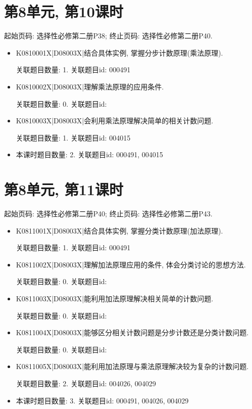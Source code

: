 \section*{第8单元, 第10课时}
起始页码: 选择性必修第二册P38; 终止页码: 选择性必修第二册P40.
\begin{itemize}
\item K0810001X|D08003X|结合具体实例, 掌握分步计数原理(乘法原理).

关联题目数量: 1. 关联题目id: 000491

\item K0810002X|D08003X|理解乘法原理的应用条件.

关联题目数量: 0. 关联题目id: 

\item K0810003X|D08003X|会利用乘法原理解决简单的相关计数问题.

关联题目数量: 1. 关联题目id: 004015

\item 本课时题目数量: 2. 关联题目id: 000491, 004015

\end{itemize}

\section*{第8单元, 第11课时}
起始页码: 选择性必修第二册P40; 终止页码: 选择性必修第二册P43.
\begin{itemize}
\item K0811001X|D08003X|结合具体实例, 掌握分类计数原理(加法原理).

关联题目数量: 1. 关联题目id: 000491

\item K0811002X|D08003X|理解加法原理应用的条件, 体会分类讨论的思想方法.

关联题目数量: 0. 关联题目id: 

\item K0811003X|D08003X|能利用加法原理解决相关简单的计数问题.

关联题目数量: 0. 关联题目id: 

\item K0811004X|D08003X|能够区分相关计数问题是分步计数还是分类计数问题.

关联题目数量: 0. 关联题目id: 

\item K0811005X|D08003X|能利用加法原理与乘法原理解决较为复杂的计数问题.

关联题目数量: 2. 关联题目id: 004026, 004029

\item 本课时题目数量: 3. 关联题目id: 000491, 004026, 004029

\end{itemize}

